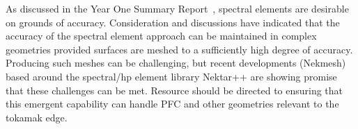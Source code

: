 As discussed in the Year One Summary Report~\cite{y1re121}, spectral elements are desirable on
grounds of accuracy. 
Consideration and discussions have indicated that the accuracy of the spectral element approach
can be maintained in complex geometries provided surfaces are meshed to a sufficiently
high degree of accuracy. Producing such meshes can be challenging, but recent developments (Nekmesh)
based around the spectral/hp element library Nektar++ are showing promise that these
challenges can be met. Resource should be directed to ensuring that this emergent capability
can handle PFC and other geometries relevant to the tokamak edge.
